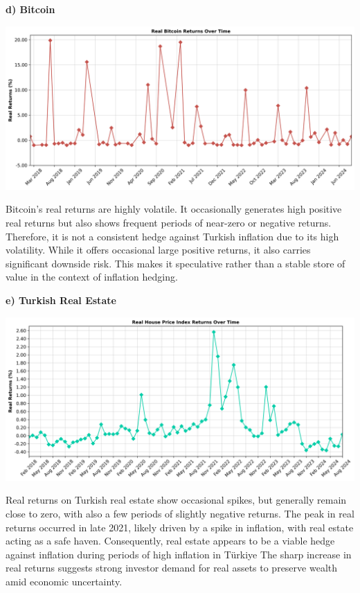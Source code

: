 \documentclass[
]{article}
\begin{document}
\textbf{d) Bitcoin}

\includegraphics[width=\textwidth]{real_bitcoin_returns.png}

Bitcoin's real returns are highly volatile. It occasionally generates high positive real returns but also shows frequent periods of near-zero or negative returns. Therefore, it is not a consistent hedge against Turkish inflation due to its high volatility. While it offers occasional large positive returns, it also carries significant downside risk. This makes it speculative rather than a stable store of value in the context of inflation hedging.

\textbf{e) Turkish Real Estate}

\includegraphics[width=\textwidth]{real_hpi_returns.png}

Real returns on Turkish real estate show occasional spikes, but generally remain close to zero, with also a few periods of slightly negative returns. The peak in real returns occurred in late 2021, likely driven by a spike in inflation, with real estate acting as a safe haven. Consequently, real estate appears to be a viable hedge against inflation during periods of high inflation in Türkiye The sharp increase in real returns suggests strong investor demand for real assets to preserve wealth amid economic uncertainty.
\end{document}
